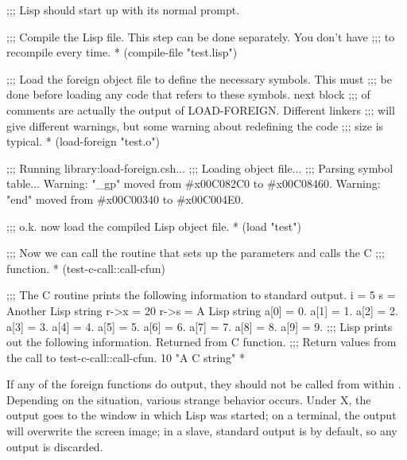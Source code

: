 \begin{example}
;;; Lisp should start up with its normal prompt.

;;; Compile the Lisp file.  This step can be done separately.  You don't have
;;; to recompile every time.
* (compile-file "test.lisp")

;;; Load the foreign object file to define the necessary symbols.  This must
;;; be done before loading any code that refers to these symbols.  next block
;;; of comments are actually the output of LOAD-FOREIGN.  Different linkers
;;; will give different warnings, but some warning about redefining the code
;;; size is typical.
* (load-foreign "test.o")

;;; Running library:load-foreign.csh...
;;; Loading object file...
;;; Parsing symbol table...
Warning:  "_gp" moved from #x00C082C0 to #x00C08460.
Warning:  "end" moved from #x00C00340 to #x00C004E0.

;;; o.k. now load the compiled Lisp object file.
* (load "test")

;;; Now we can call the routine that sets up the parameters and calls the C
;;; function.
* (test-c-call::call-cfun)

;;; The C routine prints the following information to standard output.
i = 5
s = Another Lisp string
r->x = 20
r->s = A Lisp string
a[0] = 0.
a[1] = 1.
a[2] = 2.
a[3] = 3.
a[4] = 4.
a[5] = 5.
a[6] = 6.
a[7] = 7.
a[8] = 8.
a[9] = 9.
;;; Lisp prints out the following information.
Returned from C function.
;;; Return values from the call to test-c-call::call-cfun.
10
"A C string"
*
\end{example}

If any of the foreign functions do output, they should not be called
from within \hemlock{}. Depending on the situation, various strange
behavior occurs. Under X, the output goes to the window in which Lisp
was started; on a terminal, the output will overwrite the \hemlock{}
screen image; in a \hemlock{} slave, standard output is
 by default, so any output is discarded.
